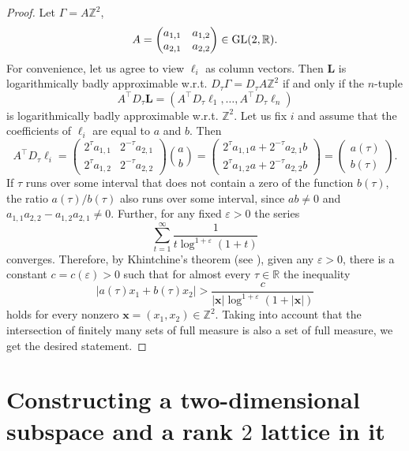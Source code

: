 \documentclass[a4paper,12pt]{article}
\theoremstyle{definition}
\theoremstyle{remark}
\theoremstyle{plain}
\renewcommand{\vec}[1]{\mathbf{#1}}
\newcommand{\e}{\varepsilon}
\newcommand{\R}{\mathbb{R}}
\newcommand{\Z}{\mathbb{Z}}
\newcommand{\Ga}{\Gamma}
\newcommand{\bL}{\mathbf{L}}
\newcommand{\Gl}{\textup{GL}}
\begin{document}
\begin{proof}
  Let $\Ga=A\Z^2$,
  \[
    A=
    \begin{pmatrix}
      a_{1,1} & a_{1,2} \\
      a_{2,1} & a_{2,2}
    \end{pmatrix}
    \in\Gl(2,\R).
  \]
  For convenience, let us agree to view $\ell_i$ as column vectors. Then $\bL$ is logarithmically badly approximable w.r.t. $D_\tau\Ga=D_\tau A\Z^2$ if and only if the $n$-tuple
  \[
    A^\top D_\tau\bL=(A^\top D_\tau\ell_1,\ldots,A^\top D_\tau\ell_n)
  \]
  is logarithmically badly approximable w.r.t. $\Z^2$. Let us fix $i$ and assume that the coefficients of $\ell_i$ are equal to $a$ and $b$. Then
  \[
    A^\top D_\tau\ell_i=
    \begin{pmatrix}
      2^\tau a_{1,1} & 2^{-\tau}a_{2,1} \\
      2^\tau a_{1,2} & 2^{-\tau}a_{2,2} 
    \end{pmatrix}
    \binom ab=
    \begin{pmatrix}
      2^\tau a_{1,1}a + 2^{-\tau}a_{2,1}b \\
      2^\tau a_{1,2}a + 2^{-\tau}a_{2,2}b
    \end{pmatrix}=
    \begin{pmatrix}
      a(\tau) \\
      b(\tau)
    \end{pmatrix}.
  \]
  If $\tau$ runs over some interval that does not contain a zero of the function $b(\tau)$, the ratio $a(\tau)/b(\tau)$ also runs over some interval, since $ab\neq0$ and $a_{1,1}a_{2,2}-a_{1,2}a_{2,1}\neq0$. Further, for any fixed $\e>0$ the series
  \[
    \sum_{t=1}^{\infty}
    \frac 1{t\log^{1+\e}(1+t)}
  \]
  converges. Therefore, by Khintchine's theorem (see \cite{khintchine_CF}), given any $\e>0$, there is a constant $c=c(\e)>0$ such that for almost every $\tau\in\R$ the inequality
  \[
    |a(\tau)x_1+b(\tau)x_2|>\frac c{|\vec x|\log^{1+\e}(1+|\vec x|)}
  \]
  holds for every nonzero $\vec x=(x_1,x_2)\in\Z^2$. Taking into account that the intersection of finitely many sets of full measure is also a set of full measure, we get the desired statement.
\end{proof}


\section{Constructing a two-dimensional subspace and a rank $2$ lattice in it}\label{sec:rank_2_sublattice_construction}
\end{document}
